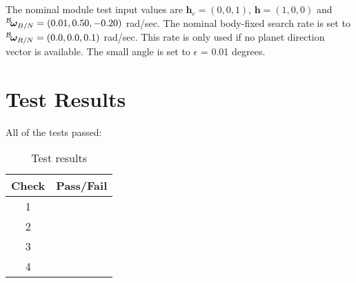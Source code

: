 The nominal module test input values are $\hat{\bm h}_{c} = (0,0,1)$, $\bm h = (1,0,0)$ and $\leftexp{B}{\bm\omega}_{B/N} = (0.01, 0.50, -0.20)$ rad/sec.  The nominal body-fixed search rate is set to $\leftexp{B}{\bm\omega}_{R/N} = (0.0, 0.0, 0.1)$ rad/sec.  This rate is only used if no planet direction vector is available.  The small angle is set to $\epsilon$ = 0.01 degrees.  



\section{Test Results}

All of the tests passed:
\begin{table}[H]
	\caption{Test results}
	\label{tab:results}
	\centering \fontsize{10}{10}\selectfont
	\begin{tabular}{c | c  } %
		\hline\hline
		\textbf{Check} 						  		&\textbf{Pass/Fail} \\ 
		\hline
	   1	   			&  \\ 
	   2	   			&  \\ 
	   3	   			&  \\ 
	   4	   			&  \\ 
	   \hline\hline
	\end{tabular}
\end{table}



